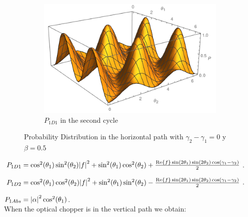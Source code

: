 \documentclass[11pt]{article}
\begin{document}
\begin{figure}[h!]
\begin{subfigure}[b]{0.40\linewidth}
\includegraphics[width=\linewidth,height=3.5 cm]{p1cd12.png}
\caption{$P_{1D1} $ in the second cycle }
\label{fig:BS1}
\end{subfigure}
\caption{Probability Distribution in the horizontal path with  $\gamma_{2}-\gamma_{1}=0 $ y $\beta=0.5$}
\label{fig:westminster}
\end{figure}

\vspace{12cm}

$P_{1D1}=\cos^2(\theta_{1})\sin^2(\theta_{2})\abs{f}^2+ \sin^2(\theta_{1})\cos^2(\theta_{2})+\frac{\Re{f} \sin(2\theta_{1})\sin(2\theta_{2})\cos(\gamma_{1}-\gamma_{2})}{2}$.

$P_{1D2}=\cos^2(\theta_{1})\cos^2(\theta_{2})\abs{f}^2+ \sin^2(\theta_{1})\sin^2(\theta_{2})-\frac{\Re{f} \sin(2\theta_{1})\sin(2\theta_{2})\cos(\gamma_{1}-\gamma_{2})}{2}$.

$P_{1Abs}=\abs{\alpha}^2 \cos^2(\theta_{1})$.\\



When the optical chopper is in the vertical path we obtain:
\end{document}
